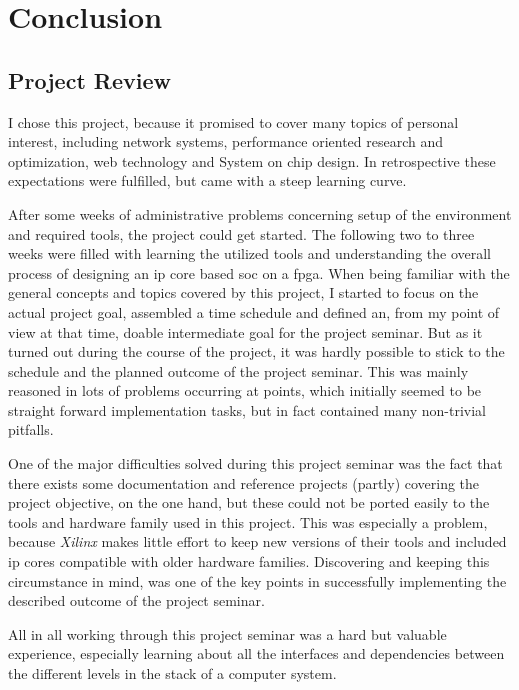 \chapter{Conclusion}

\section{Project Review}

I chose this project, because it promised to cover many topics of personal interest, including network systems, performance oriented research and optimization, web technology and System on chip design. In retrospective these expectations were fulfilled, but came with a steep learning curve.

After some weeks of administrative problems concerning setup of the environment and required tools, the project could get started. The following two to three weeks were filled with learning the utilized tools and understanding the overall process of designing an \gls{ip} core based \gls{soc} on a \gls{fpga}. When being familiar with the general concepts and topics covered by this project, I started to focus on the actual project goal, assembled a time schedule and defined an, from my point of view at that time, doable intermediate goal for the project seminar. But as it turned out during the course of the project, it was hardly possible to stick to the schedule and the planned outcome of the project seminar. This was mainly reasoned in lots of problems occurring at points, which initially seemed to be straight forward implementation tasks, but in fact contained many non-trivial pitfalls. 

One of the major difficulties solved during this project seminar was the fact that there exists some documentation and reference projects (partly) covering the project objective, on the one hand, but these could not be ported easily to the tools and hardware family used in this project. This was especially a problem, because \textit{Xilinx} makes little effort to keep new versions of their tools and included \gls{ip} cores compatible with older hardware families. Discovering and keeping this circumstance in mind, was one of the key points in successfully implementing the described outcome of the project seminar.

All in all working through this project seminar was a hard but valuable experience, especially learning about all the interfaces and dependencies between the different levels in the stack of a computer system.

